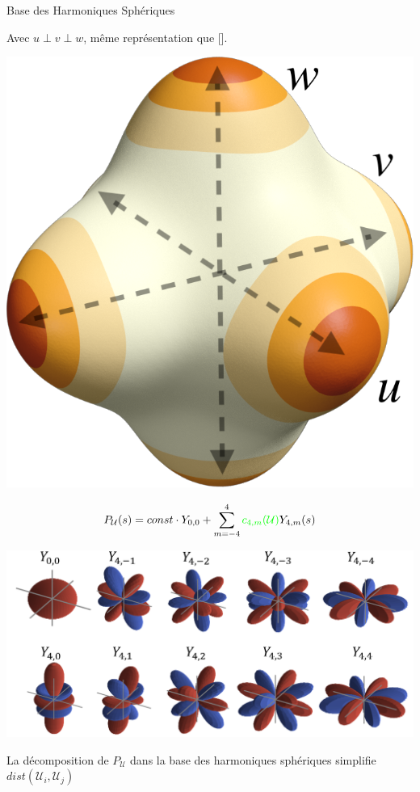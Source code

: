 \begin{frame}{Base des Harmoniques Sphériques}
    \centering
    \begin{overprint}
     \centering
    Avec $u \perp v \perp w$, même représentation que [\cite{huang_boundary_2011}].\\
    
    \begin{minipage}[c]{0.24\textwidth}
        \centering
          \vspace*{.5\baselineskip}
          \hfill
        \includegraphics[width=0.6\linewidth]{img_spm_ff/sperical_3dir4.png}
    \end{minipage}
    \begin{minipage}[c]{0.74\textwidth}
        $$P_\mathcal{U}(s) = const \cdot Y_{0, 0} + \sum_{m = -4}^4{{\color{green}c_{4, m}(\mathcal{U})}Y_{4,m}(s)}$$ 
    \end{minipage}
    
    \includegraphics[width=.8\linewidth]{img_spm_ff/ortho_harmonic_decompo.PNG} 
    
     \centering
        La décomposition de $P_\mathcal{U}$ dans la base des harmoniques sphériques simplifie $dist(\mathcal{U}_i, \mathcal{U}_j)$ \\
    

\end{overprint}
\end{frame}

